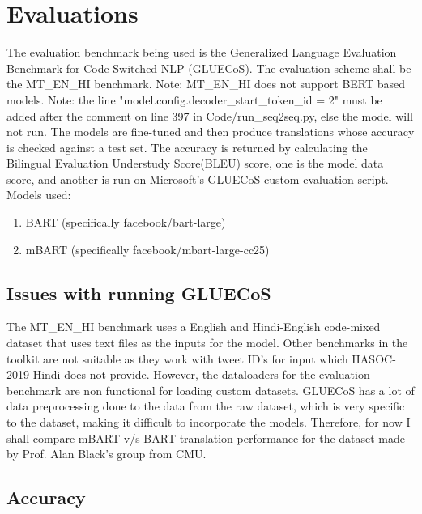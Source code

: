 \documentclass{article}
\begin{document}
\section{Evaluations}
The evaluation benchmark being used is the Generalized Language Evaluation Benchmark for Code-Switched NLP (GLUECoS).
\newline
\newline
The evaluation scheme shall be the MT\_EN\_HI benchmark.\newline
Note: MT\_EN\_HI does not support BERT based models.\newline
Note: the line "model.config.decoder\_start\_token\_id = 2" must be added after the comment on line 397 in Code/run\_seq2seq.py, else the model will not run.\newline
The models are fine-tuned and then produce translations whose accuracy is checked against a test set.
The accuracy is returned by calculating the Bilingual Evaluation Understudy Score(BLEU) score, one is the model data score, and another is run on Microsoft's GLUECoS custom evaluation script.
\newline
\newline
Models used:
\begin{enumerate}
    \item BART (specifically facebook/bart-large)
    \item mBART (specifically facebook/mbart-large-cc25)
\end{enumerate}
\subsection{Issues with running GLUECoS}
The MT\_EN\_HI benchmark uses a English and Hindi-English code-mixed dataset that uses text files as the inputs for the model.
Other benchmarks in the toolkit are not suitable as they work with tweet ID's for input which HASOC-2019-Hindi does not provide.
However, the dataloaders for the evaluation benchmark are non functional for loading custom datasets.
GLUECoS has a lot of data preprocessing done to the data from the raw dataset, which is very specific to the dataset, making it difficult to incorporate the models.
\newline\newline
Therefore, for now I shall compare mBART v/s BART translation performance for the dataset made by Prof. Alan Black's group from CMU.

\subsection{Accuracy}
\end{document}
